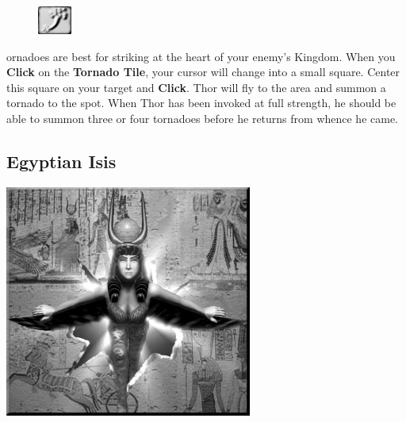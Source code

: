 \begin{figure}
	\vspace{-20pt}
	\begin{center}
		\includegraphics[width=0.1\textwidth]{Ttornedo}
	\end{center}
	\vspace{-20pt}
\end{figure}

ornadoes are best for striking at the heart of your enemy’s Kingdom. When you \textbf{Click} on the \textbf{Tornado Tile}, your cursor will change into a small square. Center this square on your target and \textbf{Click}. Thor will fly to the area and summon a tornado to the spot. When Thor has been invoked at full strength, he should be able to summon three or four tornadoes before he returns from whence he came.

\clearpage

\subsection{Egyptian Isis}


\begin{center}
	\includegraphics[width=1\linewidth]{Aisis}
\end{center}

